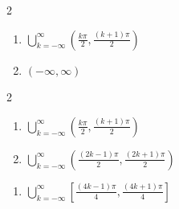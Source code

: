 \documentclass{ximera}
\begin{document}
\begin{multicols}{2}

\begin{enumerate}

\setcounter{enumi}{\value{HW}}

\item $\displaystyle \bigcup_{k=-\infty}^{\infty} \left( \frac{k\pi}{2}, \frac{(k+1)\pi}{2} \right)$
\item $(-\infty, \infty)$ 

\setcounter{HW}{\value{enumi}}

\end{enumerate}

\end{multicols}

\begin{multicols}{2}

\begin{enumerate}

\setcounter{enumi}{\value{HW}}

\item $\displaystyle \bigcup_{k=-\infty}^{\infty} \left( \frac{k\pi}{2}, \frac{(k+1)\pi}{2} \right)$
\item $\displaystyle \bigcup_{k=-\infty}^{\infty} \left( \frac{(2k - 1)\pi}{2}, \frac{(2k+1)\pi}{2} \right)$

\setcounter{HW}{\value{enumi}}

\end{enumerate}

\end{multicols}

\begin{enumerate}

\setcounter{enumi}{\value{HW}}

\item $\displaystyle \bigcup_{k=-\infty}^{\infty} \left[ \frac{(4k - 1)\pi}{4}, \frac{(4k+1)\pi}{4} \right]$

\setcounter{HW}{\value{enumi}}

\end{enumerate}
\end{document}
